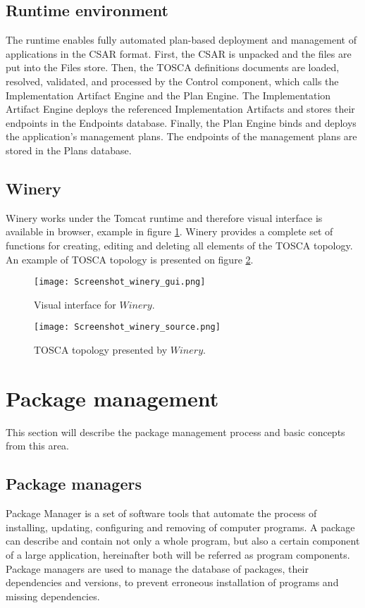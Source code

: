 \subsection*{Runtime environment}
The runtime enables fully automated plan-based deployment and management of applications in the CSAR format. 
First, the CSAR is unpacked and the files are put into the Files store.
Then, the TOSCA definitions documents are loaded, resolved, validated, and processed by the Control component, which calls the Implementation Artifact Engine and the Plan Engine.
The Implementation Artifact Engine deploys the referenced Implementation Artifacts and stores their endpoints in the Endpoints database. 
Finally, the Plan Engine binds and deploys the application’s management plans.
The endpoints of the management plans are stored in the Plans database.
\cite{INPROC-2013-45}
\subsection*{Winery}\label{subs:wine}
Winery works under the Tomcat runtime and therefore visual interface is available in browser, example in figure \ref{fig:winery_gui}.
Winery provides a complete set of functions for creating, editing and deleting all elements of the TOSCA topology. 
An example of TOSCA topology is presented on figure \ref{fig:winery_source}.
\begin{figure}[ht]   
	\centering
	\texttt{[image: Screenshot\_winery\_gui.png]}
	\caption{Visual interface for $Winery$.}
	\label{fig:winery_gui}
\end{figure}
\begin{figure}[ht]   
\centering
\texttt{[image: Screenshot\_winery\_source.png]}
\caption{TOSCA topology presented by $Winery$.}
\label{fig:winery_source}
\end{figure}


\section{Package management} \label{sec:pm}
This section will describe the package management process and basic concepts from this area.
\subsection*{Package managers}
Package Manager is a set of software tools that automate the process of installing, updating, configuring and removing of computer programs.
A package can describe and contain not only a whole program, but also a certain component of a large application, hereinafter both will be referred as program components.
Package managers are used to manage the database of packages, their dependencies and versions, to prevent erroneous installation of programs and missing dependencies.
